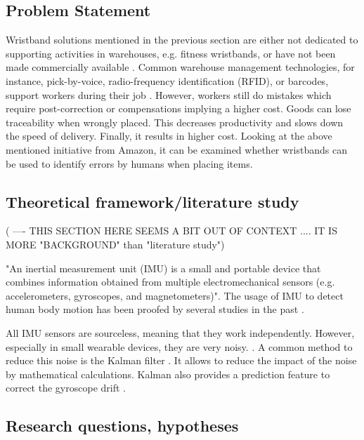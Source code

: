 \documentclass[12pt,twoside, hidelinks]{article}
\begin{document}
\subsection{Problem Statement}
\label{sect:problem}
Wristband solutions mentioned in the previous section are either not dedicated to supporting activities in warehouses, e.g. fitness wristbands, or have not been made commercially available \cite{bergerLudwig2007}. Common warehouse management technologies, for instance, pick-by-voice, radio-frequency identification (RFID), or barcodes, support workers during their job \cite{battini2015}. However, workers still do mistakes which require post-correction or compensations implying a higher cost. Goods can lose traceability when wrongly placed. This decreases productivity and slows down the speed of delivery. Finally, it results in higher cost. Looking at the above mentioned initiative from Amazon, it can be examined whether wristbands can be used to identify errors by humans when placing items.

\subsection{Theoretical framework/literature study}
\label{sect:framework}

( ---- THIS SECTION HERE SEEMS A BIT OUT OF CONTEXT .... IT IS MORE "BACKGROUND" than "literature study")

"An inertial measurement unit (IMU) is a small and portable device that combines information obtained from multiple electromechanical sensors (e.g. accelerometers, gyroscopes, and magnetometers)"\cite{schall2016}. The usage of IMU to detect human body motion has been proofed by several studies in the past \cite{schall2016} \cite{tao2018} \cite{georgi2015}.

All IMU sensors are sourceless, meaning that they work independently. However, especially in small wearable devices, they are very noisy. \cite{gallagher2004efficient}. A common method to reduce this noise is the Kalman  filter \cite{kalman1960new}. It allows to reduce the impact of the noise by mathematical calculations. Kalman also provides a prediction feature to correct the gyroscope drift \cite{Welch95anintroduction} \cite{Lee2009}.


\subsection{Research questions, hypotheses}
\label{sect:questions}
\end{document}
